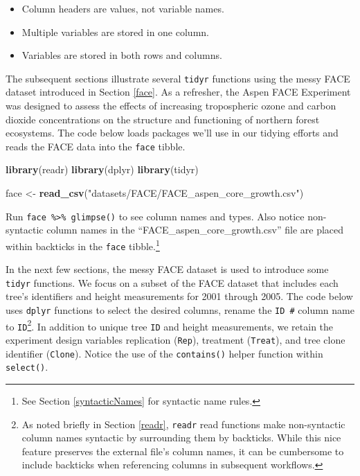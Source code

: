 \documentclass[
  11pt,
]{krantz}
\newenvironment{Shaded}{\begin{snugshade}}{\end{snugshade}}
\newcommand{\KeywordTok}[1]{\textcolor[rgb]{0.13,0.29,0.53}{\textbf{#1}}}
\newcommand{\NormalTok}[1]{#1}
\newcommand{\StringTok}[1]{\textcolor[rgb]{0.31,0.60,0.02}{#1}}
\providecommand{\tightlist}{%
  \setlength{\itemsep}{0pt}\setlength{\parskip}{0pt}}
\theoremstyle{definition}
\theoremstyle{definition}
\theoremstyle{definition}
\theoremstyle{definition}
\theoremstyle{remark}
\begin{document}
\begin{itemize}
\tightlist
\item
  Column headers are values, not variable names.
\item
  Multiple variables are stored in one column.
\item
  Variables are stored in both rows and columns.
\end{itemize}

The subsequent sections illustrate several \texttt{tidyr} functions using the messy FACE dataset introduced in Section \ref{face}. As a refresher, the Aspen FACE Experiment was designed to assess the effects of increasing tropospheric ozone and carbon dioxide concentrations on the structure and functioning of northern forest ecosystems. The code below loads packages we'll use in our tidying efforts and reads the FACE data into the \texttt{face} tibble.

\begin{Shaded}
\begin{Highlighting}[]
\KeywordTok{library}\NormalTok{(readr)}
\KeywordTok{library}\NormalTok{(dplyr)}
\KeywordTok{library}\NormalTok{(tidyr)}

\NormalTok{face \textless{}{-}}\StringTok{ }\KeywordTok{read\_csv}\NormalTok{(}\StringTok{"datasets/FACE/FACE\_aspen\_core\_growth.csv"}\NormalTok{)}
\end{Highlighting}
\end{Shaded}

Run \texttt{face\ \%\textgreater{}\%\ glimpse()} to see column names and types. Also notice non-syntactic column names in the ``FACE\_aspen\_core\_growth.csv'' file are placed within backticks in the \texttt{face} tibble.\footnote{See Section \ref{syntacticNames} for syntactic name rules.}

In the next few sections, the messy FACE dataset is used to introduce some \texttt{tidyr} functions. We focus on a subset of the FACE dataset that includes each tree's identifiers and height measurements for 2001 through 2005. The code below uses \texttt{dplyr} functions to select the desired columns, rename the \texttt{\textasciigrave{}ID\ \#\textasciigrave{}} column name to \texttt{ID}\footnote{As noted briefly in Section \ref{readr}, \texttt{readr} read functions make non-syntactic column names syntactic by surrounding them by backticks. While this nice feature preserves the external file's column names, it can be cumbersome to include backticks when referencing columns in subsequent workflows.}. In addition to unique tree \texttt{ID} and height measurements, we retain the experiment design variables replication (\texttt{Rep}), treatment (\texttt{Treat}), and tree clone identifier (\texttt{Clone}). Notice the use of the \texttt{contains()} helper function within \texttt{select()}.
\end{document}
